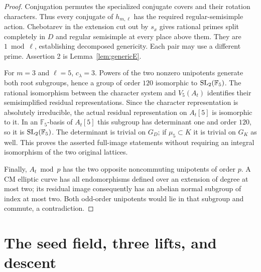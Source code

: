 \documentclass[11pt,a4paper]{article}
\theoremstyle{definition}\newtheorem{definition}[theorem]{Definition}
\theoremstyle{remark}\newtheorem*{remark}{Remark}
\newcommand{\F}{\mathbb F}\newcommand{\OO}{\mathcal O}
\begin{document}
\begin{proof}
Conjugation permutes the specialized conjugate covers and their rotation
characters. Thus every conjugate of \(h_{m,\ell}\) has the required
regular-semisimple action. Chebotarev in the extension cut out by \(s_x\)
gives rational primes split completely in \(D\) and regular semisimple at
every place above them. They are \(1\bmod\ell\), establishing decomposed
genericity. Each pair may use a different prime. Assertion 2 is
Lemma~\ref{lem:genericE}.

For $m=3$ and $\ell=5$, $c_\lambda=3$. Powers of the two nonzero
unipotents generate both root subgroups, hence a group of order $120$
isomorphic to $\SL_2(\F_5)$. The rational isomorphism between the character
system and $V_5(A_t)$ identifies their semisimplified residual representations.
Since the character representation is absolutely irreducible, the actual
residual representation on $A_t[5]$ is isomorphic to it. In an $\F_5$-basis
of $A_t[5]$ this subgroup has determinant one and order $120$, so it is
$\SL_2(\F_5)$. The determinant is trivial on $G_D$; if $\mu_5\subset K$
it is trivial on $G_K$ as well. This proves the asserted full-image statements
without requiring an integral isomorphism of the two original lattices.

Finally, \(A_t\bmod p\) has the two opposite noncommuting unipotents of order
\(p\). A CM elliptic curve has all endomorphisms defined over an extension
of degree at most two; its residual image consequently has an abelian normal
subgroup of index at most two. Both odd-order unipotents would lie in that
subgroup and commute, a contradiction.
\end{proof}

\section{The seed field, three lifts, and descent}
\end{document}
